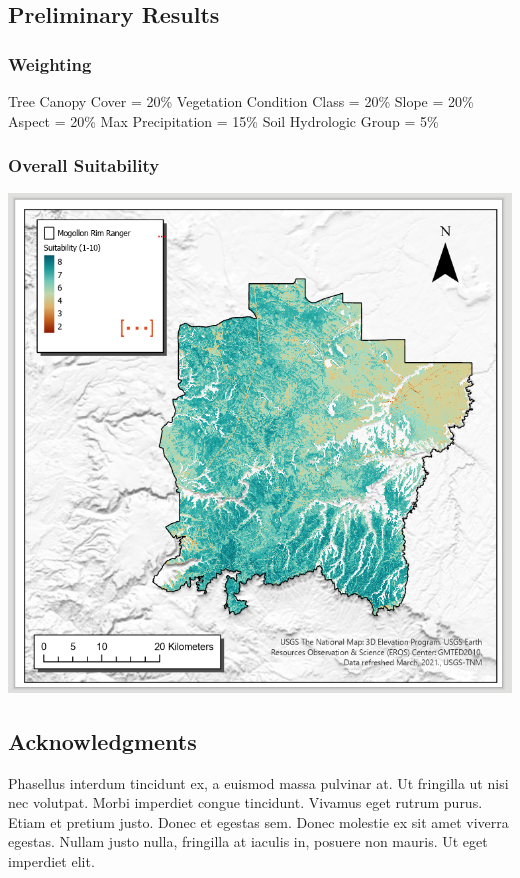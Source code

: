 \documentclass[
  number]{elsarticle}
\begin{document}
\subsection{Preliminary Results}\label{preliminary-results}

\subsubsection{Weighting}\label{weighting}

Tree Canopy Cover = 20\% Vegetation Condition Class = 20\% Slope = 20\%
Aspect = 20\% Max Precipitation = 15\% Soil Hydrologic Group = 5\%

\subsubsection{Overall Suitability}\label{overall-suitability}

\includegraphics{images/PreliminarySuitabilityMap.PNG}

\subsection{Acknowledgments}\label{acknowledgments}

Phasellus interdum tincidunt ex, a euismod massa pulvinar at. Ut
fringilla ut nisi nec volutpat. Morbi imperdiet congue tincidunt.
Vivamus eget rutrum purus. Etiam et pretium justo. Donec et egestas sem.
Donec molestie ex sit amet viverra egestas. Nullam justo nulla,
fringilla at iaculis in, posuere non mauris. Ut eget imperdiet elit.
\end{document}
